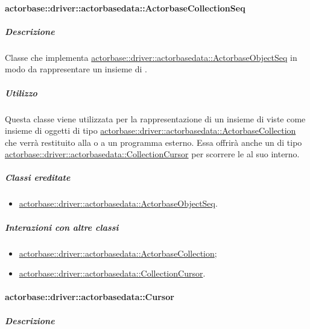 \documentclass{scalatekids-article}
\begin{document}
\paragraph{actorbase::driver::actorbasedata::ActorbaseCollectionSeq}
\label{sec:actorbase::driver::actorbasedata::ActorbaseCollectionSeq}

\subparagraph{Descrizione}

Classe che implementa \hyperref[sec:actorbase::driver::actorbasedata::ActorbaseObjectSeq]{actorbase::driver::actorbasedata::\allowbreak{}ActorbaseObjectSeq}
in modo da rappresentare un insieme di .

\subparagraph{Utilizzo}

Questa classe viene utilizzata per la rappresentazione di un insieme di
 viste come insieme di oggetti di tipo
\hyperref[sec:actorbase::driver::actorbasedata::ActorbaseCollection]{actorbase::driver::actorbasedata::ActorbaseCollection}
che verrà restituito alla  o a un programma esterno.
Essa offrirà anche un  di tipo
\hyperref[sec:actorbase::driver::actorbasedata::CollectionCursor]{actorbase::driver::actorbasedata::CollectionCursor}
per scorrere le  al suo interno.

\subparagraph{Classi ereditate}

\begin{itemize}
\item \hyperref[sec:actorbase::driver::actorbasedata::ActorbaseObjectSeq]{actorbase::driver::actorbasedata::ActorbaseObjectSeq}.
\end{itemize}

\subparagraph{Interazioni con altre classi}

\begin{itemize}
\item \hyperref[sec:actorbase::driver::actorbasedata::ActorbaseCollection]{actorbase::driver::actorbasedata::ActorbaseCollection};
\item \hyperref[sec:actorbase::driver::actorbasedata::CollectionCursor]{actorbase::driver::actorbasedata::CollectionCursor}.
\end{itemize}

\paragraph{actorbase::driver::actorbasedata::Cursor}
\label{sec:actorbase::driver::actorbasedata::Cursor}

\subparagraph{Descrizione}
\end{document}
